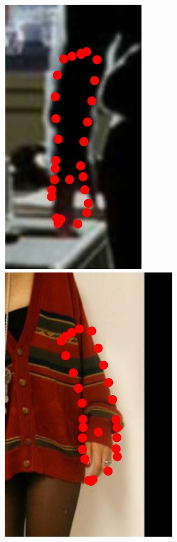 \begin{figure}
    \includegraphics[height=\ofh]{resources/Annotation_Correction/Suplementory_Meterial/ExFit/0030}
    \hfill
    \includegraphics[height=\ofh]{resources/Annotation_Correction/Suplementory_Meterial/ExFit/0031}
    \hfill

\end{figure}
